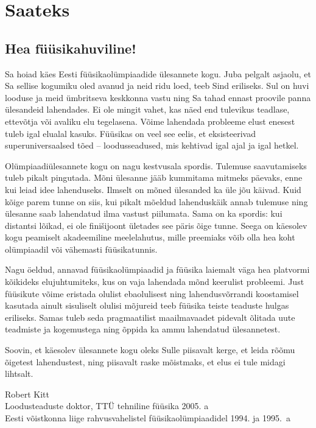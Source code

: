 \documentclass[11pt, twoside]{article}
\begin{document}
{\sloppy
\setlength{\parindent}{24pt}
\section*{Saateks}
\subsection*{Hea füüsikahuviline!}

Sa hoiad käes Eesti füüsikaolümpiaadide ülesannete kogu. Juba pelgalt asjaolu, et Sa sellise kogumiku oled avanud ja neid ridu loed, teeb Sind eriliseks. Sul on huvi looduse ja meid ümbritseva keskkonna vastu ning Sa tahad ennast proovile panna ülesandeid lahendades. Ei ole mingit vahet, kas näed end tulevikus teadlase, ettevõtja või avaliku elu tegelasena. Võime lahendada probleeme elust enesest tuleb igal elualal kasuks. Füüsikas on veel see eelis, et eksisteerivad superuniversaalsed tõed – loodusseadused, mis kehtivad igal ajal ja igal hetkel.

Olümpiaadiülesannete kogu on nagu kestvusala spordis. Tulemuse saavutamiseks tuleb pikalt pingutada. Mõni ülesanne jääb kummitama mitmeks päevaks, enne kui leiad idee lahenduseks. Ilmselt on mõned ülesanded ka üle jõu käivad. Kuid kõige parem tunne on siis, kui pikalt mõeldud lahenduskäik annab tulemuse ning ülesanne saab lahendatud ilma vastust piilumata. Sama on ka spordis: kui distantsi lõikad, ei ole finišijoont ületades see päris õige tunne. Seega on käesolev kogu peamiselt akadeemiline meelelahutus, mille preemiaks võib olla hea koht olümpiaadil või vähemasti füüsikatunnis.

Nagu öeldud, annavad füüsikaolümpiaadid ja füüsika laiemalt väga hea platvormi kõikideks elujuhtumiteks, kus on vaja lahendada mõnd keerulist probleemi.
Just füüsikute võime eristada olulist ebaolulisest ning lahendusvõrrandi koostamisel kasutada ainult sisuliselt olulisi mõjureid teeb füüsika teiste teaduste hulgas eriliseks. Samas tuleb seda pragmaatilist maailmavaadet pidevalt õlitada uute teadmiste ja kogemustega ning õppida ka ammu lahendatud ülesannetest.

Soovin, et käesolev ülesannete kogu oleks Sulle piisavalt kerge, et leida rõõmu õigetest lahendustest, ning piisavalt raske mõistmaks, et elus ei tule midagi lihtsalt.


\vspace{0.5\baselineskip}\noindent
Robert Kitt\\
Loodusteaduste doktor, TTÜ tehniline füüsika 2005. a\\
Eesti võistkonna liige rahvusvahelistel füüsikaolümpiaadidel 1994. ja 1995.~a

}
\end{document}
